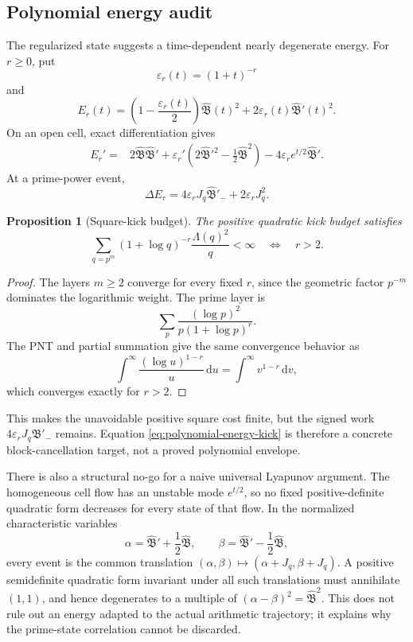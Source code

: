 \documentclass[11pt,a4paper]{article}
\numberwithin{equation}{section}
\newtheorem{proposition}[theorem]{Proposition}
\theoremstyle{definition}
\newcommand{\dd}{\,\mathrm{d}}
\newcommand{\Bhat}{\widehat{\mathfrak B}}
\begin{document}
\subsection{Polynomial energy audit}

The regularized state suggests a time-dependent nearly degenerate energy.
For \(r\ge0\), put
\[
  \varepsilon_r(t)=(1+t)^{-r}
\]
and
\begin{equation}\label{eq:polynomial-energy}
  E_r(t)
  =\left(1-\frac{\varepsilon_r(t)}2\right)\Bhat(t)^2
  +2\varepsilon_r(t)\Bhat'(t)^2.
\end{equation}
On an open cell, exact differentiation gives
\begin{align}
  E_r'={}&2\Bhat\Bhat'
  +\varepsilon_r'\left(2\Bhat'^2-\frac12\Bhat^2\right)
  -4\varepsilon_r e^{t/2}\Bhat'.
  \label{eq:polynomial-energy-flow}
\end{align}
At a prime-power event,
\begin{equation}\label{eq:polynomial-energy-kick}
  \boxed{
  \Delta E_r
  =4\varepsilon_r J_q\Bhat'_-
  +2\varepsilon_rJ_q^2.
  }
\end{equation}

\begin{proposition}[Square-kick budget]
\label{prop:square-kick-budget}
The positive quadratic kick budget satisfies
\begin{equation}\label{eq:square-kick-convergence}
  \boxed{
  \sum_{q=p^m}(1+\log q)^{-r}\frac{\Lambda(q)^2}{q}<\infty
  \quad\Longleftrightarrow\quad r>2.
  }
\end{equation}
\end{proposition}

\begin{proof}
The layers \(m\ge2\) converge for every fixed \(r\), since the geometric
factor \(p^{-m}\) dominates the logarithmic weight.  The prime layer is
\[
  \sum_p\frac{(\log p)^2}{p(1+\log p)^r}.
\]
The PNT and partial summation give the same convergence behavior as
\[
  \int^\infty\frac{(\log u)^{1-r}}u\dd u
  =\int^\infty v^{1-r}\dd v,
\]
which converges exactly for \(r>2\).
\end{proof}

This makes the unavoidable positive square cost finite, but the signed work
\(4\varepsilon_rJ_q\Bhat'_-\) remains.  Equation
\eqref{eq:polynomial-energy-kick} is therefore a concrete block-cancellation
target, not a proved polynomial envelope.

There is also a structural no-go for a naive universal Lyapunov argument.
The homogeneous cell flow has an unstable mode \(e^{t/2}\), so no fixed
positive-definite quadratic form decreases for every state of that flow.
In the normalized characteristic variables
\[
  \alpha=\Bhat'+\frac12\Bhat,
  \qquad
  \beta=\Bhat'-\frac12\Bhat,
\]
every event is the common translation
\((\alpha,\beta)\mapsto(\alpha+J_q,\beta+J_q)\).  A positive semidefinite
quadratic form invariant under all such translations must annihilate
\((1,1)\), and hence degenerates to a multiple of
\((\alpha-\beta)^2=\Bhat^2\).
This does not rule out an energy adapted to the actual arithmetic trajectory;
it explains why the prime-state correlation cannot be discarded.
\end{document}
